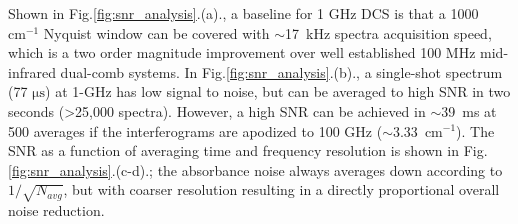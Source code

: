 \documentclass{optica-article}
\begin{document}
Shown in \mbox{Fig.\ref{fig:snr_analysis}.(a).}, a baseline for 1 GHz DCS is that a 1000 $\mathrm{cm^{-1}}$ Nyquist window can be covered with \mbox{$\sim$17 kHz} spectra acquisition speed, which is a two order magnitude improvement over well established 100 MHz mid-infrared dual-comb systems. In \mbox{Fig.\ref{fig:snr_analysis}.(b).}, a single-shot spectrum (77 $\mathrm{\mu s}$) at 1-GHz has low signal to noise, but can be averaged to high SNR in two seconds (>25,000 spectra). However, a high SNR can be achieved in \mbox{$\sim$39 ms} at 500 averages if the interferograms are apodized to 100 GHz (\mbox{$\sim$3.33 $\mathrm{cm^{-1}}$}).  The SNR as a function of averaging time and frequency resolution is shown in \mbox{Fig.\ref{fig:snr_analysis}.(c-d).}; the absorbance noise always averages down according to $1/\sqrt{N_{avg}}$, but with coarser resolution resulting in a directly proportional overall noise reduction. 



\end{document}
